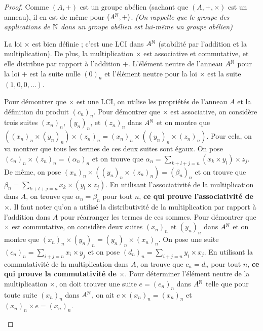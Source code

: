 \documentclass[12pt, a4paper]{report}
\begin{document}
\begin{proof}
    Comme $(A,+)$ est un groupe abélien (sachant que $(A,+,\times)$ est un anneau), il en est de même pour $(A^{\mathbb{N}}, +)$. \textit{(On rappelle que le groupe des applications de $\mathbb{N}$ dans un groupe abélien est lui-même un groupe abélien)}
    
    La loi $\times$ est bien définie ; c'est une LCI dans $A^{\mathbb{N}}$ (stabilité par l'addition et la multiplication). De plus, la multiplication $\times$ est associative et commutative, et elle distribue par rapport à l'addition $+$. L'élément neutre de l'anneau $A^{\mathbb{N}}$ pour la loi $+$ est la suite nulle $(0)_n$ et l'élément neutre pour la loi $\times$ est la suite $(1, 0, 0, \ldots)$. 

    \begin{outline}
        \1 Pour démontrer que $\times$ est une LCI, on utilise les propriétés de l'anneau $A$ et la définition du produit $(c_n)_n$.
        \1 Pour démontrer que $\times$ est associative, on considère trois suites $(x_n)_n$, $(y_n)_n$, et $(z_n)_n$ dans $A^{\mathbb{N}}$ et on montre que $((x_n)_n \times (y_n)_n) \times (z_n)_n = (x_n)_n \times ((y_n)_n \times (z_n)_n)$.
            \2 Pour cela, on va montrer que tous les termes de ces deux suites sont égaux.
            \2 On pose $(c_n)_n\times (z_n)_n = (\alpha_n)_n$ et on trouve que $\alpha_n = \sum_{k+l+j=n}(x_k \times y_l)\times z_j$.
            \2 De même, on pose $(x_n)_n\times ((y_n)_n\times(z_n)_n) = (\beta_n)_n$ et on trouve que $\beta_n = \sum_{k+l+j=n}x_k\times (y_l \times z_j)$.
            \2 En utilisant l'associativité de la multiplication dans $A$, on trouve que $\alpha_n = \beta_n$ pour tout $n$, \textbf{ce qui prouve l'associativité de $\times$}.
            \2 Il faut noter qu'on a utilisé la distributivité de la multiplication par rapport à l'addition dans $A$ pour réarranger les termes de ces sommes.
        \1 Pour démontrer que $\times$ est commutative, on considère deux suites $(x_n)_n$ et $(y_n)_n$ dans $A^{\mathbb{N}}$ et on montre que $(x_n)_n \times (y_n)_n = (y_n)_n \times (x_n)_n$.
            \2 On pose une suite $(c_n)_n = \sum_{i+j=n} x_i \times y_j$ et on pose $(d_n)_n = \sum_{i+j=n} y_i \times x_j$.
            \2 En utilisant la commutativité de la multiplication dans $A$, on trouve que $c_n = d_n$ pour tout $n$, \textbf{ce qui prouve la commutativité de $\times$}.
        \1 Pour déterminer l'élément neutre de la multiplication $\times$, on doit trouver une suite $e = (e_n)_n$ dans $A^{\mathbb{N}}$ telle que pour toute suite $(x_n)_n$ dans $A^{\mathbb{N}}$, on ait $e \times (x_n)_n = (x_n)_n$ et $(x_n)_n \times e = (x_n)_n$.

\end{outline}
\end{proof}
\end{document}
